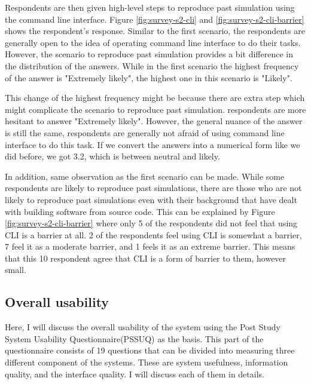 \vspace{0.5cm}

Respondents are then given high-level steps to reproduce past simulation using the command line interface.  Figure \ref{fig:survey-s2-cli} and \ref{fig:survey-s2-cli-barrier} shows the respondent's response. Similar to the first scenario, the respondents are generally open to the idea of operating command line interface to do their tasks. However, the scenario to reproduce past simulation provides a bit difference in the distribution of the answers. While in the first scenario the highest frequency of the answer is "Extremely likely", the highest one in this scenario is "Likely". 

This change of the highest frequency might be because there are extra step which might complicate the scenario to reproduce past simulation. respondents are more hesitant to answer "Extremely likely". However, the general nuance of the answer is still the same, respondents are generally not afraid of using command line interface to do this task. If we convert the answers into a numerical form like we did before, we got 3.2, which is between neutral and likely. 

In addition, same observation as the first scenario can be made. While some respondents are likely to reproduce past simulations, there are those who are not likely to reproduce past simulations even with their background that have dealt with building software from source code. This can be explained by Figure \ref{fig:survey-s2-cli-barrier} where only 5 of the respondents did not feel that using CLI is a barrier at all. 2 of the respondents feel using CLI is somewhat a barrier, 7 feel it as a moderate barrier, and  1 feels it as an extreme barrier. This means that this 10 respondent agree that CLI is a form of barrier to them, however small.


\subsection{Overall usability}


Here, I will discuss the overall usability of the system using the Post Study System Usability Questionnaire(PSSUQ) as the basis. This part of the questionnaire consists of 19 questions that can be divided into measuring three different component of the systems. These are system usefulness, information quality, and the interface quality. I will discuss each of them in details.

